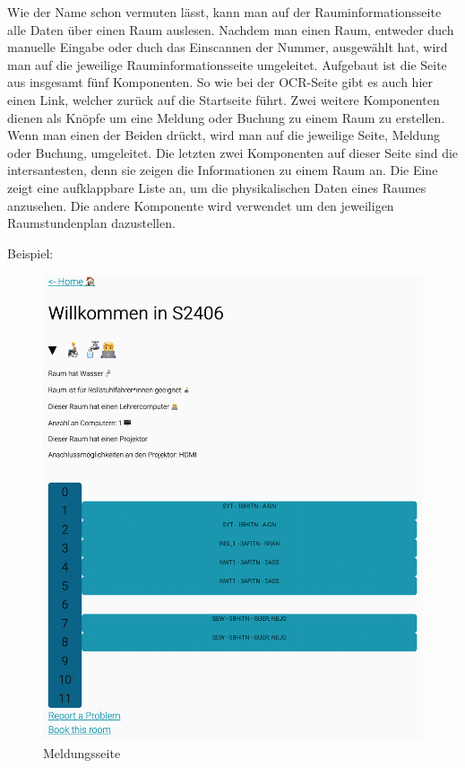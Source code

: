
Wie der Name schon vermuten lässt, kann man auf der Rauminformationsseite alle Daten über einen Raum auslesen. Nachdem man einen Raum, entweder duch manuelle Eingabe oder duch das Einscannen der Nummer, ausgewählt hat, wird man auf die jeweilige Rauminformationsseite umgeleitet. Aufgebaut ist die Seite aus insgesamt fünf Komponenten. So wie bei der OCR-Seite gibt es auch hier einen Link, welcher zurück auf die Startseite führt. Zwei weitere Komponenten dienen als Knöpfe um eine Meldung oder Buchung zu einem Raum zu erstellen. Wenn man einen der Beiden drückt, wird man auf die jeweilige Seite, Meldung oder Buchung, umgeleitet. Die letzten zwei Komponenten auf dieser Seite sind die intersantesten, denn sie zeigen die Informationen zu einem Raum an. Die Eine zeigt eine aufklappbare Liste an, um die physikalischen Daten eines Raumes anzusehen. Die andere Komponente wird verwendet um den jeweiligen Raumstundenplan dazustellen.

Beispiel:

\begin{figure}[H]
    \centering
    \includegraphics[width=120mm]{media/WebComponents/Rauminformationsseite_light.png}
    \caption{Meldungsseite}
\end{figure}


